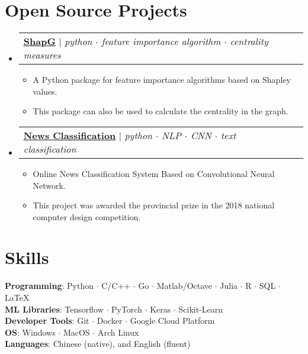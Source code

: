 \documentclass[letterpaper,10pt]{article}
\makeatletter
\newcommand{\link}[2]{\href{#1}{\color{blue}\underline{#2}}}
\newcommand{\resumeItem}[1]{
  \item\small{
    {#1 \vspace{-2pt}}
  }
}
\newcommand{\resumeProjectHeading}[2]{
  \item
  \begin{tabular*}{0.97\textwidth}{l@{\extracolsep{\fill}}r}
    \small#1 & #2 \\
  \end{tabular*}\vspace{-7pt}
}
\newenvironment{resumeSubHeadingList}{\begin{itemize}[leftmargin=0.15in, label={}]}{\end{itemize}}
\newenvironment{resumeItemList}{\begin{itemize}}{\end{itemize}}
\makeatother
\begin{document}
\section{Open Source Projects}
\begin{resumeSubHeadingList}

  \resumeProjectHeading{
    \link{https://github.com/vectorsss/shapG}{\textbf{ShapG}} $|$
    \emph{python $\cdot$ feature importance algorithm $\cdot$ centrality
          measures}}{}
  \begin{resumeItemList}
    \resumeItem{A Python package for feature importance algorithms based on
                Shapley values.}
    \resumeItem{This package can also be used to calculate the centrality in
                the graph.}
  \end{resumeItemList}

  \resumeProjectHeading{
    \link{https://github.com/vectorsss/news_classification}{\textbf{News
          Classification}} $|$
    \emph{python $\cdot$ NLP $\cdot$ CNN $\cdot$ text classification}}{}
  \begin{resumeItemList}
    \resumeItem{Online News Classification System Based on Convolutional Neural
                Network.}
    \resumeItem{This project was awarded the provincial  prize in the
                2018 national computer design competition.}
  \end{resumeItemList}
\end{resumeSubHeadingList}

\section{Skills}
\begin{itemize}[leftmargin=0.15in, label={}]
  \small{\item{
        \textbf{Programming}{: Python $\cdot$ C/C++ $\cdot$ Go $\cdot$ Matlab/Octave $\cdot$ Julia $\cdot$ R $\cdot$ SQL $\cdot$ \LaTeX} \\
        \textbf{ML Libraries}{: Tensorflow $\cdot$  PyTorch $\cdot$ Keras $\cdot$  Scikit-Learn} \\
        \textbf{Developer Tools}{: Git $\cdot$ Docker $\cdot$  Google Cloud Platform} \\
        \textbf{OS}{: Windows $\cdot$ MacOS $\cdot$ Arch Linux} \\
        \textbf{Languages}{: Chinese (native), and English (fluent)}
        }}
\end{itemize}
\end{document}
